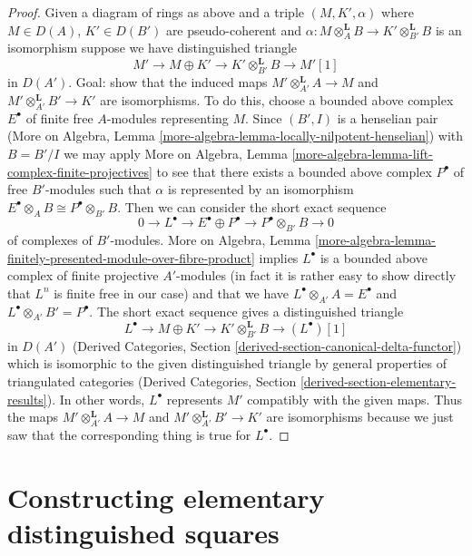 \documentclass{stacks-project}
\theoremstyle{plain}
\theoremstyle{definition}
\theoremstyle{remark}
\numberwithin{equation}{subsection}
\begin{document}
\begin{proof}
\medskip\noindent
Given a diagram of rings as above and a triple
$(M, K', \alpha)$ where $M \in D(A)$, $K' \in D(B')$ are
pseudo-coherent and
$\alpha : M \otimes_A^\mathbf{L} B \to K' \otimes_{B'}^\mathbf{L} B$
is an isomorphism suppose we have distinguished triangle
$$
M' \to M \oplus K' \to K' \otimes_{B'}^\mathbf{L} B \to M'[1]
$$
in $D(A')$. Goal: show that the induced maps
$M' \otimes_{A'}^\mathbf{L} A \to M$ and
$M' \otimes_{A'}^\mathbf{L} B' \to K'$ are isomorphisms.
To do this, choose a bounded above complex
$E^\bullet$ of finite free $A$-modules representing $M$.
Since $(B', I)$ is a henselian pair
(More on Algebra, Lemma \ref{more-algebra-lemma-locally-nilpotent-henselian})
with $B = B'/I$ we may apply More on Algebra, Lemma
\ref{more-algebra-lemma-lift-complex-finite-projectives}
to see that there exists a bounded above complex $P^\bullet$
of free $B'$-modules such that $\alpha$ is represented
by an isomorphism $E^\bullet \otimes_A B \cong P^\bullet \otimes_{B'} B$.
Then we can consider the short exact sequence
$$
0 \to L^\bullet \to
E^\bullet \oplus P^\bullet \to P^\bullet \otimes_{B'} B \to 0
$$
of complexes of $B'$-modules.
More on Algebra, Lemma
\ref{more-algebra-lemma-finitely-presented-module-over-fibre-product}
implies $L^\bullet$ is a bounded above complex of
finite projective $A'$-modules
(in fact it is rather easy to show directly that $L^n$ is finite free
in our case) and that we have
$L^\bullet \otimes_{A'} A = E^\bullet$ and
$L^\bullet \otimes_{A'} B' = P^\bullet$.
The short exact sequence gives a distinguished triangle
$$
L^\bullet \to M \oplus K' \to K' \otimes_{B'}^\mathbf{L} B \to (L^\bullet)[1]
$$
in $D(A')$ (Derived Categories, Section
\ref{derived-section-canonical-delta-functor}) which is isomorphic
to the given distinguished triangle by general properties of
triangulated categories (Derived Categories, Section
\ref{derived-section-elementary-results}). In other words, $L^\bullet$
represents $M'$ compatibly with the given maps. Thus the maps
$M' \otimes_{A'}^\mathbf{L} A \to M$ and
$M' \otimes_{A'}^\mathbf{L} B' \to K'$ are
isomorphisms because we just saw that the corresponding
thing is true for $L^\bullet$.
\end{proof}







\section{Constructing elementary distinguished squares}
\label{section-elementary-dsitnguished-squares}
\end{document}
